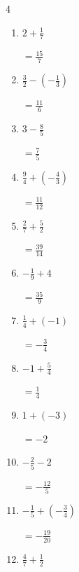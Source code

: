 \begin{multicols}{4}
\begin{enumerate}
        $\displaystyle =\frac{77}{40}$

  \item $\displaystyle 2 + \frac{1}{7}$

        $\displaystyle =\frac{15}{7}$

  \item $\displaystyle \frac{3}{2} - \left(-\frac{1}{3}\right)$

        $\displaystyle =\frac{11}{6}$

  \item $\displaystyle 3 - \frac{8}{5}$

        $\displaystyle =\frac{7}{5}$

  \item $\displaystyle \frac{9}{4} + \left(-\frac{4}{3}\right)$

        $\displaystyle =\frac{11}{12}$

  \item $\displaystyle \frac{2}{7} + \frac{5}{2}$

        $\displaystyle =\frac{39}{14}$

\columnbreak %

\resetques

  \item $\displaystyle -\frac{1}{9} + 4$

        $\displaystyle =\frac{35}{9}$

  \item $\displaystyle \frac{1}{4} + \left(-1\right)$

        $\displaystyle =-\frac{3}{4}$

  \item $\displaystyle -1 + \frac{5}{4}$

        $\displaystyle =\frac{1}{4}$

  \item $\displaystyle 1 + \left(-3\right)$

        $\displaystyle =-2$

  \item $\displaystyle -\frac{2}{5} - 2$

        $\displaystyle =-\frac{12}{5}$

  \item $\displaystyle -\frac{1}{5} + \left(-\frac{3}{4}\right)$

        $\displaystyle =-\frac{19}{20}$

  \item $\displaystyle \frac{4}{7} + \frac{1}{2}$


\end{enumerate}
\end{multicols}
